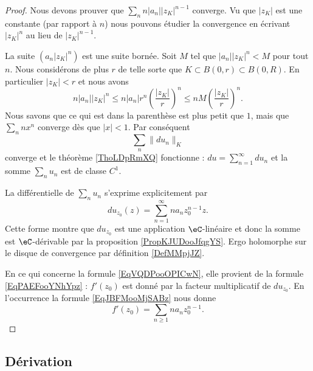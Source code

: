 \begin{proof}
    Nous devons prouver que \( \sum_nn| a_n | |z_K |^{n-1}\) converge. Vu que \( | z_K |\) est une constante (par rapport à \( n\)) nous pouvons étudier la convergence en écrivant \( | z_K |^n\) au lieu de \( | z_K |^{n-1}\).

    La suite \( (a_n| z_K |^n)\) est une suite bornée. Soit \( M\) tel que \( | a_n | |z_K |^n<M\) pour tout \( n\). Nous considérons de plus \( r\) de telle sorte que \( K\subset B(0,r)\subset B(0,R)\). En particulier \( | z_K |<r\) et nous avons
    \begin{equation}
        n| a_n | |z_K |^n\leq n| a_n |r^n\left( \frac{ | z_K | }{ r } \right)^n\leq nM\left( \frac{ | z_K | }{ r } \right)^n.
    \end{equation}
    Nous savons que ce qui est dans la parenthèse est plus petit que \( 1\), mais que \( \sum_nnx^n\) converge dès que \( | x |<1\). Par conséquent
    \begin{equation}
        \sum_n\| du_n \|_K
    \end{equation}
    converge et le théorème \ref{ThoLDpRmXQ} fonctionne : \( du=\sum_{n=1}^{\infty}du_n\) et la somme \( \sum_nu_n\) est de classe \( C^1\).

    La différentielle de \( \sum_nu_n\) s'exprime explicitement par
    \begin{equation}        \label{EqJBFMooMjSABz}
        du_{z_0}(z)=\sum_{n=1}^{\infty}na_nz_0^{n-1}z.
    \end{equation}
    Cette forme montre que \( du_{z_0}\) est une application \( \eC\)-linéaire et donc la somme est \( \eC\)-dérivable par la proposition \ref{PropKJUDooJfqgYS}. Ergo holomorphe sur le disque de convergence par définition \ref{DefMMpjJZ}.

    En ce qui concerne la formule \eqref{EqVQDPooOPICwN}, elle provient de la formule \eqref{EqPAEFooYNhYpz} : \( f'(z_0)\) est donné par la facteur multiplicatif de \( du_{z_0}\). En l'occurrence la formule \eqref{EqJBFMooMjSABz} nous donne
    \begin{equation}
        f'(z_0)=\sum_{n\geq 1}na_nz_0^{n-1}.
    \end{equation}
\end{proof}

\subsection{Dérivation}

